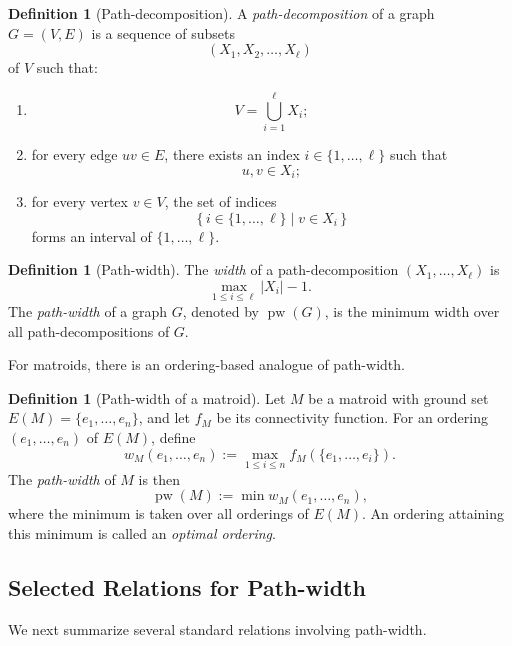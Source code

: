 \documentclass[10pt]{book}
\theoremstyle{definition}
\newtheorem{definition}[theorem]{Definition}
\DeclareMathOperator{\pw}{pw}
\begin{document}
\begin{definition}[Path-decomposition]
A \emph{path-decomposition} of a graph \(G=(V,E)\) is a sequence of subsets
\[
(X_1,X_2,\dots,X_\ell)
\]
of \(V\) such that:
\begin{enumerate}
    \item
    \[
    V=\bigcup_{i=1}^{\ell} X_i;
    \]
    \item for every edge \(uv\in E\), there exists an index \(i\in\{1,\dots,\ell\}\) such that
    \[
    u,v\in X_i;
    \]
    \item for every vertex \(v\in V\), the set of indices
    \[
    \{\, i\in\{1,\dots,\ell\}\mid v\in X_i \,\}
    \]
    forms an interval of \(\{1,\dots,\ell\}\).
\end{enumerate}
\end{definition}

\begin{definition}[Path-width]
The \emph{width} of a path-decomposition \((X_1,\dots,X_\ell)\) is
\[
\max_{1\leq i\leq \ell}|X_i|-1.
\]
The \emph{path-width} of a graph \(G\), denoted by \(\pw(G)\), is the minimum width over all path-decompositions of \(G\).
\end{definition}

For matroids, there is an ordering-based analogue of path-width.

\begin{definition}[Path-width of a matroid]
\cite{kashyap2008matroid}
Let \(M\) be a matroid with ground set \(E(M)=\{e_1,\dots,e_n\}\), and let \(f_M\) be its connectivity function.
For an ordering \((e_1,\dots,e_n)\) of \(E(M)\), define
\[
w_M(e_1,\dots,e_n):=
\max_{1\leq i\leq n} f_M(\{e_1,\dots,e_i\}).
\]
The \emph{path-width} of \(M\) is then
\[
\pw(M):=\min w_M(e_1,\dots,e_n),
\]
where the minimum is taken over all orderings of \(E(M)\).
An ordering attaining this minimum is called an \emph{optimal ordering}.
\end{definition}

\subsection{Selected Relations for Path-width}

We next summarize several standard relations involving path-width.
\end{document}
